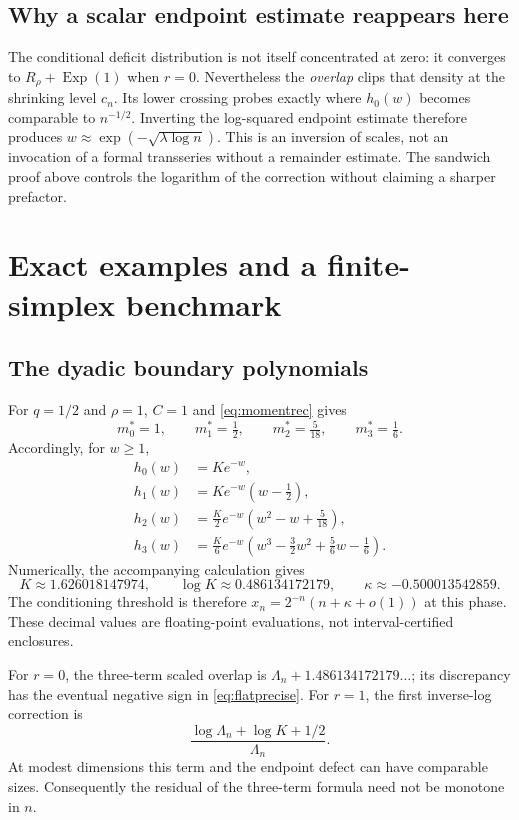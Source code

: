 \documentclass[11pt,oneside]{article}
\numberwithin{equation}{section}
\theoremstyle{plain}
\theoremstyle{definition}
\theoremstyle{remark}
\newcommand{\Exp}{\operatorname{Exp}}
\begin{document}
\subsection{Why a scalar endpoint estimate reappears here}
The conditional deficit distribution is not itself concentrated at
zero: it converges to $R_\rho+\Exp(1)$ when $r=0$. Nevertheless the
\emph{overlap} clips that density at the shrinking level $c_n$.
Its lower crossing probes exactly where $h_0(w)$ becomes comparable
to $n^{-1/2}$. Inverting the log-squared endpoint estimate therefore
produces $w\approx\exp(-\sqrt{\lambda\log n})$. This is an inversion
of scales, not an invocation of a formal transseries without a
remainder estimate. The sandwich proof above controls the logarithm
of the correction without claiming a sharper prefactor.

\section{Exact examples and a finite-simplex benchmark}
\label{sec:examples}
\subsection{The dyadic boundary polynomials}
For $q=1/2$ and $\rho=1$, $C=1$ and \eqref{eq:momentrec} gives
\[
 m_0^*=1,\qquad m_1^*=\tfrac12,\qquad
 m_2^*=\tfrac5{18},\qquad m_3^*=\tfrac16.
\]
Accordingly, for $w\ge1$,
\begin{align}
 h_0(w)&=K e^{-w},\nonumber\\
 h_1(w)&=K e^{-w}(w-\tfrac12),\nonumber\\
 h_2(w)&=\tfrac K2 e^{-w}(w^2-w+\tfrac5{18}),\label{eq:dyadicpolys}\\
 h_3(w)&=\tfrac K6 e^{-w}(w^3-\tfrac32w^2+\tfrac56w-\tfrac16).
 \nonumber
\end{align}
Numerically, the accompanying calculation gives
\begin{equation}\label{eq:dyadicconstants}
 K\approx1.626018147974,\qquad
 \log K\approx0.486134172179,\qquad
 \kappa\approx-0.500013542859.
\end{equation}
The conditioning threshold is therefore
$x_n=2^{-n}(n+\kappa+o(1))$ at this phase. These decimal values are
floating-point evaluations, not interval-certified enclosures.

For $r=0$, the three-term scaled overlap is
$\Lambda_n+1.486134172179\ldots$; its discrepancy has the eventual
negative sign in \eqref{eq:flatprecise}. For $r=1$, the first
inverse-log correction is
\[
 \frac{\log\Lambda_n+\log K+1/2}{\Lambda_n}.
\]
At modest dimensions this term and the endpoint defect can have
comparable sizes. Consequently the residual of the three-term
formula need not be monotone in $n$.
\end{document}
